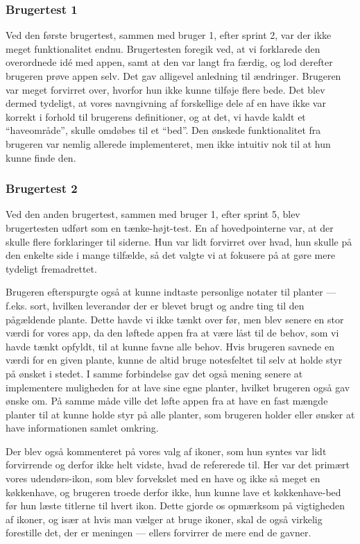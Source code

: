 \subsubsection{Brugertest 1}
Ved den første brugertest, sammen med bruger 1, efter sprint 2, var der ikke meget funktionalitet endnu. Brugertesten foregik ved, at vi forklarede den overordnede idé med appen, samt at den var langt fra færdig, og lod derefter brugeren prøve appen selv. Det gav alligevel anledning til ændringer. Brugeren var meget forvirret over, hvorfor hun ikke kunne tilføje flere bede. Det blev dermed tydeligt, at vores navngivning af forskellige dele af en have ikke var korrekt i forhold til brugerens definitioner, og at det, vi havde kaldt et ``haveområde'', skulle omdøbes til et ``bed''. Den ønskede funktionalitet fra brugeren var nemlig allerede implementeret, men ikke intuitiv nok til at hun kunne finde den.

\subsubsection{Brugertest 2}
Ved den anden brugertest, sammen med bruger 1, efter sprint 5, blev brugertesten udført som en tænke-højt-test. En af hovedpointerne var, at der skulle flere forklaringer til siderne. Hun var lidt forvirret over hvad, hun skulle på den enkelte side i mange tilfælde, så det valgte vi at fokusere på at gøre mere tydeligt fremadrettet.

Brugeren efterspurgte også at kunne indtaste personlige notater til planter --- f.eks. sort, hvilken leverandør der er blevet brugt og andre ting til den pågældende plante. Dette havde vi ikke tænkt over før, men blev senere en stor værdi for vores app, da den løftede appen fra at være låst til de behov, som vi havde tænkt opfyldt, til at kunne favne alle behov. Hvis brugeren savnede en værdi for en given plante, kunne de altid bruge notesfeltet til selv at holde styr på ønsket i stedet. I samme forbindelse gav det også mening senere at implementere muligheden for at lave sine egne planter, hvilket brugeren også gav ønske om. På samme måde ville det løfte appen fra at have en fast mængde planter til at kunne holde styr på alle planter, som brugeren holder eller ønsker at have informationen samlet omkring.

Der blev også kommenteret på vores valg af ikoner, som hun syntes var lidt forvirrende og derfor ikke helt vidste, hvad de refererede til. Her var det primært vores udendørs-ikon, som blev forvekslet med en have og ikke så meget en køkkenhave, og brugeren troede derfor ikke, hun kunne lave et køkkenhave-bed før hun læste titlerne til hvert ikon. Dette gjorde os opmærksom på vigtigheden af ikoner, og især at hvis man vælger at bruge ikoner, skal de også virkelig forestille det, der er meningen --- ellers forvirrer de mere end de gavner.

